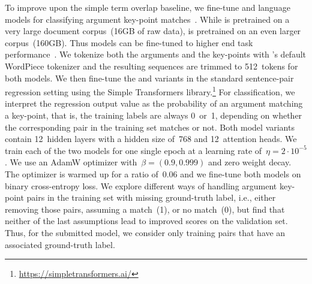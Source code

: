To improve upon the simple term overlap baseline, we fine-tune \Bert and \Roberta language models for classifying argument key-point matches~\cite{DevlinCLT2019,LiuOGDJCLLZS2019}.
While \Bert is pretrained on a very large document corpus~(16GB of raw data), \Roberta is pretrained on an even larger corpus~(160GB).
Thus \Roberta models can be fine-tuned to higher end task performance~\cite{LiuOGDJCLLZS2019}.
We tokenize both the arguments and the key-points with \Bert's default WordPiece tokenizer and the resulting sequences are trimmed to 512~tokens for both models.
We then fine-tune the \BertBase and \RobertaBase variants in the standard sentence-pair regression setting using the Simple Transformers library.\footnote{\url{https://simpletransformers.ai/}}
For classification, we interpret the regression output value as the probability of an argument matching a key-point, that is, the training labels are always 0~or~1, depending on whether the corresponding pair in the training set matches or not.
Both model variants contain 12~hidden layers with a hidden size of~768 and 12~attention heads.
We train each of the two models for one single epoch at a learning rate of~\( \eta = 2 \cdot 10^{-5} \).
We use an AdamW optimizer with~\( \beta = (0.9, 0.999) \) and zero weight decay.
The optimizer is warmed up for a ratio of~0.06 and we fine-tune both models on binary cross-entropy loss.
We explore different ways of handling argument key-point pairs in the training set with missing ground-truth label, i.e., either removing those pairs, assuming a match~(1), or no match~(0), but find that neither of the last assumptions lead to improved scores on the validation set.
Thus, for the submitted model, we consider only training pairs that have an associated ground-truth label.

